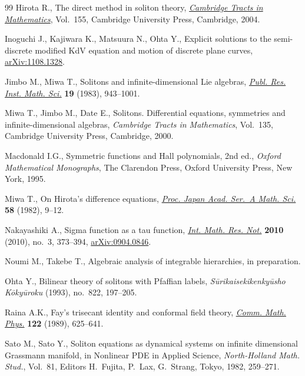 \documentclass[pdftex]{sigma}
\begin{document}
\begin{thebibliography}{99}
Hirota R., The direct method in soliton theory, \href{http://dx.doi.org/10.1017/CBO9780511543043}{\textit{Cambridge Tracts in
  Mathematics}}, Vol.~155, Cambridge University Press, Cambridge, 2004.


Inoguchi J., Kajiwara K., Matsuura N., Ohta Y., Explicit solutions to the
  semi-discrete modif\/ied KdV equation and motion of discrete plane curves,
  \href{http://arxiv.org/abs/1108.1328}{arXiv:1108.1328}.

Jimbo M., Miwa T., Solitons and inf\/inite-dimensional {L}ie algebras,
  \href{http://dx.doi.org/10.2977/prims/1195182017}{\textit{Publ. Res. Inst. Math. Sci.}} \textbf{19} (1983), 943--1001.

Miwa T., Jimbo M., Date E.,
Solitons. Dif\/ferential equations, symmetries and inf\/inite-dimensional algebras,
\textit{Cambridge Tracts in Mathematics}, Vol.~135, Cambridge University Press, Cambridge, 2000.

Macdonald I.G., Symmetric functions and {H}all polynomials, 2nd ed., \textit{Oxford
  Mathematical Monographs}, The Clarendon Press, Oxford University Press, New
  York, 1995.

Miwa T., On {H}irota's dif\/ference equations, \href{http://dx.doi.org/10.3792/pjaa.58.9}{\textit{Proc. Japan Acad. Ser.~A
  Math. Sci.}} \textbf{58} (1982), 9--12.

Nakayashiki A., Sigma function as a tau function, \href{http://dx.doi.org/10.1093/imrn/rnp135}{\textit{Int. Math. Res. Not.}}
  {\bf 2010} (2010), no.~3, 373--394, \href{http://arxiv.org/abs/0904.0846}{arXiv:0904.0846}.

Noumi M., Takebe T., Algebraic analysis of integrable hierarchies, {i}n
  preparation.

Ohta Y., Bilinear theory of solitons with {P}faf\/f\/ian labels,
  \textit{S\=urikaisekikenky\=usho K\=oky\=uroku}  (1993), no.~822, 197--205.

Raina A.K., Fay's trisecant identity and conformal f\/ield theory, \href{http://dx.doi.org/10.1007/BF01256498}{\textit{Comm.
  Math. Phys.}} \textbf{122} (1989), 625--641.

Sato M., Sato Y., Soliton equations as dynamical systems on inf\/inite
  dimensional Grassmann manifold, in Nonlinear PDE in Applied Science,
  \textit{North-Holland Math. Stud.}, Vol.~81, Editors H.~Fujita, P.~Lax,
  G.~Strang, Tokyo, 1982, 259--271.


\end{thebibliography}
\end{document}

